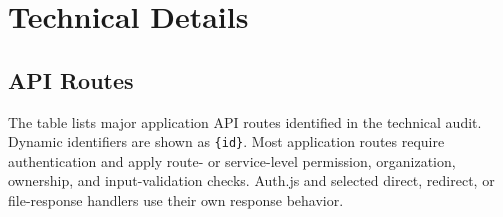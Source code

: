 \cleardoublepage
\appendix

\chapter{Technical Details}
\label{appendix:technical-details}

\section{API Routes}

The table lists major application API routes identified in the technical audit. Dynamic identifiers are shown as \texttt{\{id\}}. Most application routes require authentication and apply route- or service-level permission, organization, ownership, and input-validation checks. Auth.js and selected direct, redirect, or file-response handlers use their own response behavior.

